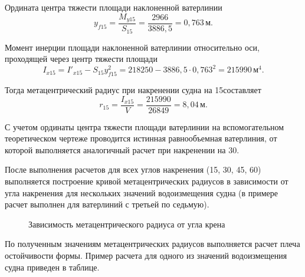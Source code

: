 Ордината центра тяжести площади наклоненной ватерлинии 
\begin{equation*}
    y_{f 15} = \frac{M_{y 15}}{S_{15}} = \frac{2966}{3886{,}5} = 0{,}763\,\text{м}.
\end{equation*}

Момент инерции площади наклоненной ватерлинии относительно оси, проходящей через центр тяжести площади
\begin{equation*}
    I_{x 15} = I'_{x 15} - S_{15} y_{f 15}^2 = 218250 - 3886{,}5 \cdot 0{,}763^2 = 215990\,\text{м}^4.
\end{equation*}

Тогда метацентрический радиус при накренении судна на 15\textdegree составляет
\begin{equation*}
    r_{15} = \frac{I_{x 15}}{V} = \frac{215990}{26849} = 8{,}04\,\text{м}.
\end{equation*}

С учетом ординаты центра тяжести площади ватерлинии на вспомогательном теоретическом чертеже проводится истинная равнообъемная ватерлиния, от которой выполняется аналогичный расчет при накренении на 30\textdegree.

После выполнения расчетов для всех углов накренения (15\textdegree, 30\textdegree, 45\textdegree, 60\textdegree) выполняется построение кривой метацентрических радиусов в зависимости от угла накренения для нескольких значений водоизмещения судна (в примере расчет выполнен для ватерлиний с третьей по седьмую).

\begin{figure}[H]
    \centerline{}
    \caption{Зависимость метацентрического радиуса от угла крена}
\end{figure}

По полученным значениям метацентрических радиусов выполняется расчет плеча остойчивости формы.
Пример расчета для одного из значений водоизмещения судна приведен в таблице.

